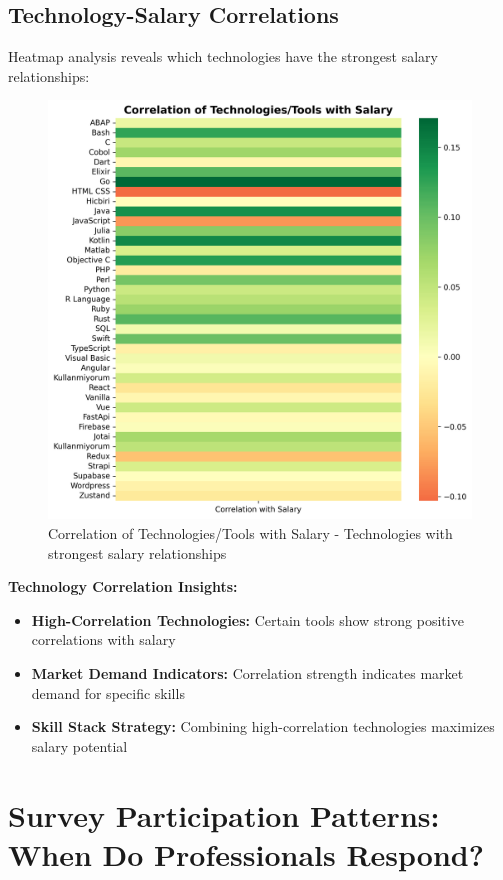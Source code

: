 \documentclass[12pt,a4paper]{article}
\begin{document}
\subsection{Technology-Salary Correlations}
Heatmap analysis reveals which technologies have the strongest salary relationships:

\begin{figure}[H]
    \centering
    \includegraphics[width=\textwidth]{figures/heatmap_tech_tool_salary.png}
    \caption{Correlation of Technologies/Tools with Salary - Technologies with strongest salary relationships}
\end{figure}

\textbf{Technology Correlation Insights:}
\begin{itemize}
    \item \textbf{High-Correlation Technologies:} Certain tools show strong positive correlations with salary
    \item \textbf{Market Demand Indicators:} Correlation strength indicates market demand for specific skills
    \item \textbf{Skill Stack Strategy:} Combining high-correlation technologies maximizes salary potential
\end{itemize}

\section{Survey Participation Patterns: When Do Professionals Respond?}
\end{document}
